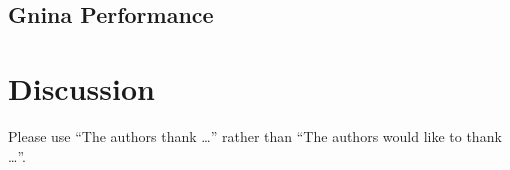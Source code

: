 \documentclass[journal=jcisd8,manuscript=article]{achemso}
\begin{document}
\subsection{Gnina Performance}

\section{Discussion}



\begin{acknowledgement}

Please use ``The authors thank \ldots'' rather than ``The
authors would like to thank \ldots''.



\end{acknowledgement}

\begin{suppinfo}



\end{suppinfo}


\end{document}
